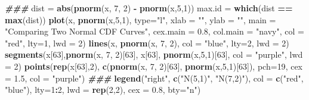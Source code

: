 \documentclass[
]{book}
\newenvironment{Shaded}{\begin{snugshade}}{\end{snugshade}}
\newcommand{\AttributeTok}[1]{\textcolor[rgb]{0.13,0.29,0.53}{#1}}
\newcommand{\DecValTok}[1]{\textcolor[rgb]{0.00,0.00,0.81}{#1}}
\newcommand{\DocumentationTok}[1]{\textcolor[rgb]{0.56,0.35,0.01}{\textbf{\textit{#1}}}}
\newcommand{\FloatTok}[1]{\textcolor[rgb]{0.00,0.00,0.81}{#1}}
\newcommand{\FunctionTok}[1]{\textcolor[rgb]{0.13,0.29,0.53}{\textbf{#1}}}
\newcommand{\NormalTok}[1]{#1}
\newcommand{\OtherTok}[1]{\textcolor[rgb]{0.56,0.35,0.01}{#1}}
\newcommand{\SpecialCharTok}[1]{\textcolor[rgb]{0.81,0.36,0.00}{\textbf{#1}}}
\newcommand{\StringTok}[1]{\textcolor[rgb]{0.31,0.60,0.02}{#1}}
\begin{document}
\begin{Shaded}
\begin{Highlighting}[]
\DocumentationTok{\#\#\#}
\NormalTok{dist }\OtherTok{=} \FunctionTok{abs}\NormalTok{(}\FunctionTok{pnorm}\NormalTok{(x, }\DecValTok{7}\NormalTok{, }\DecValTok{2}\NormalTok{) }\SpecialCharTok{{-}} \FunctionTok{pnorm}\NormalTok{(x,}\DecValTok{5}\NormalTok{,}\DecValTok{1}\NormalTok{))}
\NormalTok{max.id }\OtherTok{=} \FunctionTok{which}\NormalTok{(dist }\SpecialCharTok{==} \FunctionTok{max}\NormalTok{(dist))}
\FunctionTok{plot}\NormalTok{(x, }\FunctionTok{pnorm}\NormalTok{(x,}\DecValTok{5}\NormalTok{,}\DecValTok{1}\NormalTok{), }\AttributeTok{type=}\StringTok{"l"}\NormalTok{, }\AttributeTok{xlab =} \StringTok{""}\NormalTok{, }\AttributeTok{ylab =} \StringTok{""}\NormalTok{, }
        \AttributeTok{main =} \StringTok{"Comparing Two Normal CDF Curves"}\NormalTok{,}
        \AttributeTok{cex.main =} \FloatTok{0.8}\NormalTok{, }\AttributeTok{col.main =} \StringTok{"navy"}\NormalTok{, }\AttributeTok{col =} \StringTok{"red"}\NormalTok{, }\AttributeTok{lty=}\DecValTok{1}\NormalTok{, }\AttributeTok{lwd =} \DecValTok{2}\NormalTok{)}
\FunctionTok{lines}\NormalTok{(x, }\FunctionTok{pnorm}\NormalTok{(x, }\DecValTok{7}\NormalTok{, }\DecValTok{2}\NormalTok{), }\AttributeTok{col =} \StringTok{"blue"}\NormalTok{, }\AttributeTok{lty=}\DecValTok{2}\NormalTok{, }\AttributeTok{lwd =} \DecValTok{2}\NormalTok{)}
\FunctionTok{segments}\NormalTok{(x[}\DecValTok{63}\NormalTok{],}\FunctionTok{pnorm}\NormalTok{(x, }\DecValTok{7}\NormalTok{, }\DecValTok{2}\NormalTok{)[}\DecValTok{63}\NormalTok{], x[}\DecValTok{63}\NormalTok{], }\FunctionTok{pnorm}\NormalTok{(x,}\DecValTok{5}\NormalTok{,}\DecValTok{1}\NormalTok{)[}\DecValTok{63}\NormalTok{], }\AttributeTok{col =} \StringTok{"purple"}\NormalTok{, }\AttributeTok{lwd =} \DecValTok{2}\NormalTok{)}
\FunctionTok{points}\NormalTok{(}\FunctionTok{rep}\NormalTok{(x[}\DecValTok{63}\NormalTok{],}\DecValTok{2}\NormalTok{), }\FunctionTok{c}\NormalTok{(}\FunctionTok{pnorm}\NormalTok{(x, }\DecValTok{7}\NormalTok{, }\DecValTok{2}\NormalTok{)[}\DecValTok{63}\NormalTok{], }\FunctionTok{pnorm}\NormalTok{(x,}\DecValTok{5}\NormalTok{,}\DecValTok{1}\NormalTok{)[}\DecValTok{63}\NormalTok{]), }\AttributeTok{pch=}\DecValTok{19}\NormalTok{, }\AttributeTok{cex =} \FloatTok{1.5}\NormalTok{, }\AttributeTok{col =} \StringTok{"purple"}\NormalTok{)}
\DocumentationTok{\#\#\#}
\FunctionTok{legend}\NormalTok{(}\StringTok{"right"}\NormalTok{, }\FunctionTok{c}\NormalTok{(}\StringTok{"N(5,1)"}\NormalTok{, }\StringTok{"N(7,2)"}\NormalTok{), }\AttributeTok{col =} \FunctionTok{c}\NormalTok{(}\StringTok{"red"}\NormalTok{, }\StringTok{"blue"}\NormalTok{), }\AttributeTok{lty=}\DecValTok{1}\SpecialCharTok{:}\DecValTok{2}\NormalTok{, }
                   \AttributeTok{lwd =} \FunctionTok{rep}\NormalTok{(}\DecValTok{2}\NormalTok{,}\DecValTok{2}\NormalTok{), }\AttributeTok{cex =} \FloatTok{0.8}\NormalTok{, }\AttributeTok{bty=}\StringTok{"n"}\NormalTok{)}
\end{Highlighting}
\end{Shaded}
\end{document}
